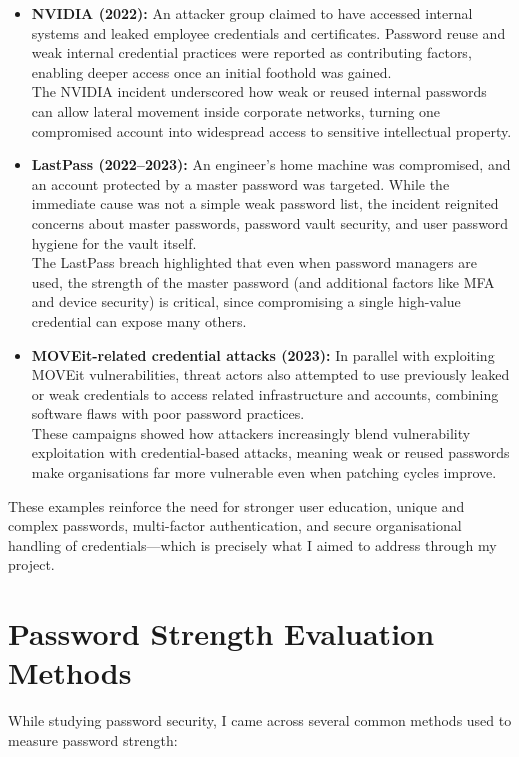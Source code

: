 \begin{itemize}
    \item \textbf{NVIDIA (2022):} An attacker group claimed to have accessed internal systems and leaked employee credentials and certificates. Password reuse and weak internal credential practices were reported as contributing factors, enabling deeper access once an initial foothold was gained.\\
    The NVIDIA incident underscored how weak or reused internal passwords can allow lateral movement inside corporate networks, turning one compromised account into widespread access to sensitive intellectual property.

    \item \textbf{LastPass (2022--2023):} An engineer's home machine was compromised, and an account protected by a master password was targeted. While the immediate cause was not a simple weak password list, the incident reignited concerns about master passwords, password vault security, and user password hygiene for the vault itself.\\
    The LastPass breach highlighted that even when password managers are used, the strength of the master password (and additional factors like MFA and device security) is critical, since compromising a single high-value credential can expose many others.

    \item \textbf{MOVEit-related credential attacks (2023):} In parallel with exploiting MOVEit vulnerabilities, threat actors also attempted to use previously leaked or weak credentials to access related infrastructure and accounts, combining software flaws with poor password practices.\\
    These campaigns showed how attackers increasingly blend vulnerability exploitation with credential-based attacks, meaning weak or reused passwords make organisations far more vulnerable even when patching cycles improve.
\end{itemize}

These examples reinforce the need for stronger user education, unique and complex passwords, multi-factor authentication, and secure organisational handling of credentials---which is precisely what I aimed to address through my project.


\section{Password Strength Evaluation Methods}

While studying password security, I came across several common methods used to measure password strength:

